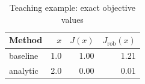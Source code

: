\begin{table}[htbp]
\centering
\caption{Teaching example: exact objective values}
\label{tab:demo}
\begin{tabular}{lrrr}
\toprule Method & $x$ & $J(x)$ & $J_{\mathrm{rob}}(x)$ \\
\midrule
baseline & 1.0 & 1.00 & 1.21 \\
analytic & 2.0 & 0.00 & 0.01 \\
\bottomrule
\end{tabular}
\end{table}
